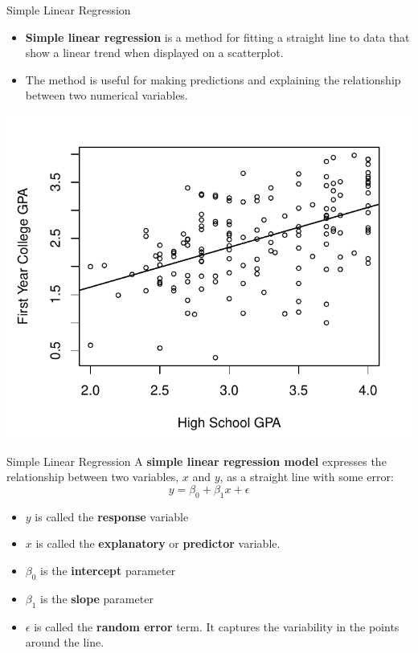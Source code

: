 \documentclass[11pt, fleqn]{beamer}\usepackage[]{graphicx}\usepackage[]{color}
\begin{document}
\begin{frame}{Simple Linear Regression}
\begin{itemize}
\item \textbf{Simple linear regression} is a method for fitting a straight line to data that show a linear trend when displayed on a scatterplot.
\item The method is useful for making predictions and explaining the relationship between two numerical variables.
\end{itemize}
\includegraphics[scale=0.5]{figure/gpa_scatter_line.pdf}
\end{frame}

\begin{frame}{Simple Linear Regression}
A \textbf{simple linear regression model} expresses the relationship between two variables, $x$ and $y$, as a straight line with some error:
$$y = \beta_0 + \beta_1 x + \epsilon$$
\begin{itemize}
\item $y$ is called the \textbf{response} variable
\item $x$ is called the \textbf{explanatory} or \textbf{predictor} variable.
\item $\beta_0$ is the \textbf{intercept} parameter
\item $\beta_1$ is the \textbf{slope} parameter
\item $\epsilon$ is called the \textbf{random error} term.  It captures the variability in the points around the line.
\end{itemize}
\end{frame}
\end{document}
